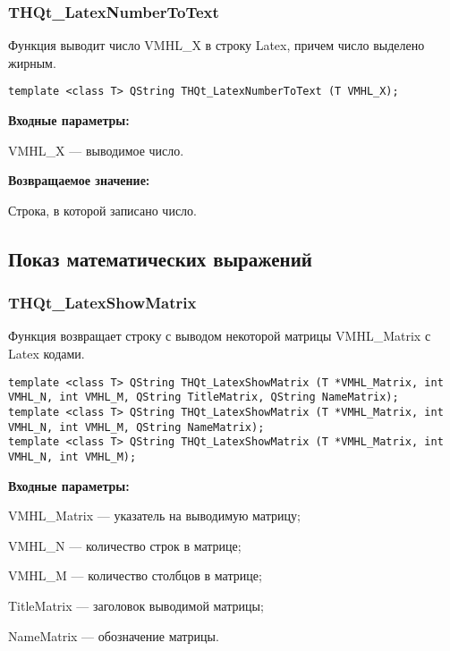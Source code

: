 \documentclass[a4paper,12pt]{article}
\begin{document}
\subsubsection{THQt\_LatexNumberToText}\label{THQt_LatexNumberToText}

Функция выводит число VMHL\_X в строку Latex, причем число выделено жирным.


\begin{lstlisting}[label=code_syntax_THQt_LatexNumberToText,caption=Синтаксис]
template <class T> QString THQt_LatexNumberToText (T VMHL_X);
\end{lstlisting}

\textbf{Входные параметры:}

VMHL\_X --- выводимое число.

\textbf{Возвращаемое значение:}

Строка, в которой записано число.


\subsection{Показ математических выражений}

\subsubsection{THQt\_LatexShowMatrix}\label{THQt_LatexShowMatrix}

Функция возвращает строку с выводом некоторой матрицы VMHL\_Matrix с Latex кодами.


\begin{lstlisting}[label=code_syntax_THQt_LatexShowMatrix,caption=Синтаксис]
template <class T> QString THQt_LatexShowMatrix (T *VMHL_Matrix, int VMHL_N, int VMHL_M, QString TitleMatrix, QString NameMatrix);
template <class T> QString THQt_LatexShowMatrix (T *VMHL_Matrix, int VMHL_N, int VMHL_M, QString NameMatrix);
template <class T> QString THQt_LatexShowMatrix (T *VMHL_Matrix, int VMHL_N, int VMHL_M);
\end{lstlisting}

\textbf{Входные параметры:}
 

VMHL\_Matrix --- указатель на выводимую матрицу;
 
    VMHL\_N --- количество строк в матрице;
 
    VMHL\_M --- количество столбцов в матрице;
 
    TitleMatrix --- заголовок выводимой матрицы;
 
    NameMatrix --- обозначение матрицы.
	
\end{document}
